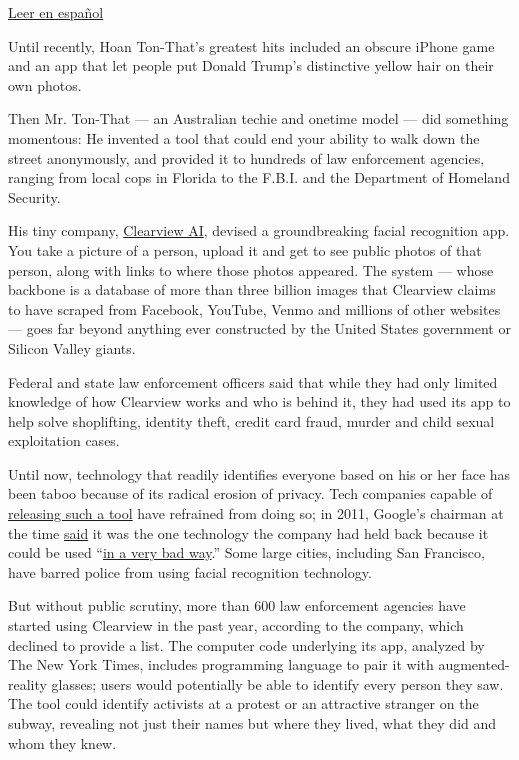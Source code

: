 \href{https://www.nytimes3xbfgragh.onion/es/2020/01/20/espanol/negocios/clearview-reconocimiento-facial.html}{Leer
en español}

Until recently, Hoan Ton-That's greatest hits included an obscure iPhone
game and an app that let people put Donald Trump's distinctive yellow
hair on their own photos.

Then Mr. Ton-That --- an Australian techie and onetime model --- did
something momentous: He invented a tool that could end your ability to
walk down the street anonymously, and provided it to hundreds of law
enforcement agencies, ranging from local cops in Florida to the F.B.I.
and the Department of Homeland Security.

His tiny company,
\href{https://www.nytimes3xbfgragh.onion/2020/02/10/podcasts/the-daily/facial-recognition-surveillance.html}{Clearview
AI}, devised a groundbreaking facial recognition app. You take a picture
of a person, upload it and get to see public photos of that person,
along with links to where those photos appeared. The system --- whose
backbone is a database of more than three billion images that Clearview
claims to have scraped from Facebook, YouTube, Venmo and millions of
other websites --- goes far beyond anything ever constructed by the
United States government or Silicon Valley giants.

Federal and state law enforcement officers said that while they had only
limited knowledge of how Clearview works and who is behind it, they had
used its app to help solve shoplifting, identity theft, credit card
fraud, murder and child sexual exploitation cases.

Until now, technology that readily identifies everyone based on his or
her face has been taboo because of its radical erosion of privacy. Tech
companies capable of
\href{https://www.cnet.com/news/facebook-built-a-facial-recognition-app-for-employees/}{releasing
such a tool} have refrained from doing so; in 2011, Google's chairman at
the time
\href{https://www.telegraph.co.uk/technology/google/8522574/Google-warns-against-facial-recognition-database.html}{said}
it was the one technology the company had held back because it could be
used
``\href{https://webcache.googleusercontent.com/search?q=cache:MwDlXjKEg2oJ:https://www.huffpost.com/entry/facial-recognition-google_n_869583+\&cd=3\&hl=en\&ct=clnk\&gl=us}{in
a very bad way}.'' Some large cities, including San Francisco, have
barred police from using facial recognition technology.

But without public scrutiny, more than 600 law enforcement agencies have
started using Clearview in the past year, according to the company,
which declined to provide a list. The computer code underlying its app,
analyzed by The New York Times, includes programming language to pair it
with augmented-reality glasses; users would potentially be able to
identify every person they saw. The tool could identify activists at a
protest or an attractive stranger on the subway, revealing not just
their names but where they lived, what they did and whom they knew.

